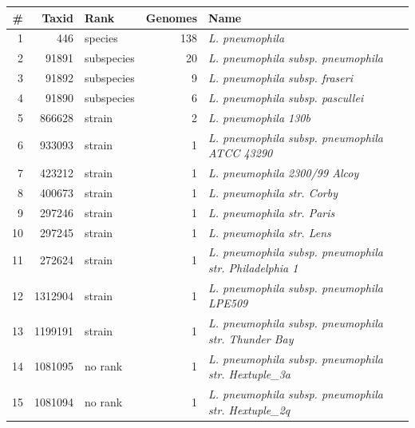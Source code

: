 \begin{tabular}{rrlrl}
\hline
\# & Taxid & Rank & Genomes & Name\\\hline
1 & 446 & species & 138 & \emph{L. pneumophila}\\
2 & 91891 & subspecies & 20 & \emph{L. pneumophila subsp. pneumophila}\\
3 & 91892 & subspecies & 9 & \emph{L. pneumophila subsp. fraseri}\\
4 & 91890 & subspecies & 6 & \emph{L. pneumophila subsp. pascullei}\\
5 & 866628 & strain & 2 & \emph{L. pneumophila 130b}\\
6 & 933093 & strain & 1 & \emph{L. pneumophila subsp. pneumophila ATCC 43290}\\
7 & 423212 & strain & 1 & \emph{L. pneumophila 2300/99 Alcoy}\\
8 & 400673 & strain & 1 & \emph{L. pneumophila str. Corby}\\
9 & 297246 & strain & 1 & \emph{L. pneumophila str. Paris}\\
10 & 297245 & strain & 1 & \emph{L. pneumophila str. Lens}\\
11 & 272624 & strain & 1 & \emph{L. pneumophila subsp. pneumophila str. Philadelphia 1}\\
12 & 1312904 & strain & 1 & \emph{L. pneumophila subsp. pneumophila LPE509}\\
13 & 1199191 & strain & 1 & \emph{L. pneumophila subsp. pneumophila str. Thunder Bay}\\
14 & 1081095 & no rank & 1 & \emph{L. pneumophila subsp. pneumophila str. Hextuple\_3a}\\
15 & 1081094 & no rank & 1 & \emph{L. pneumophila subsp. pneumophila str. Hextuple\_2q}\\
\hline
\end{tabular}      
